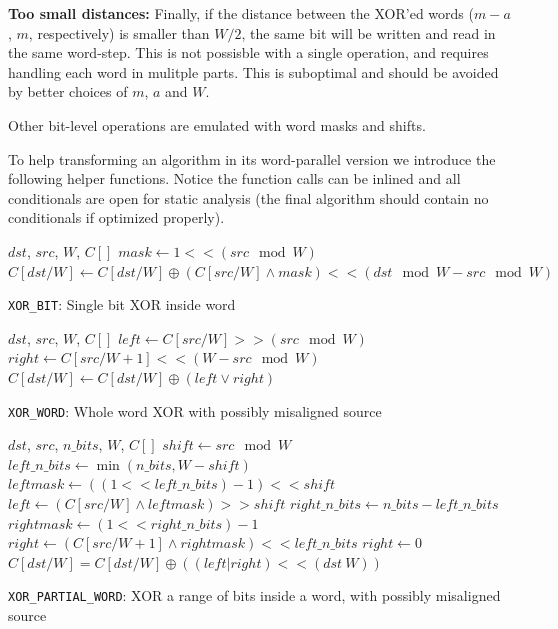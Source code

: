 \textbf{Too small distances:}
Finally, if the distance between the XOR'ed words ($m-a$, $m$, respectively) is smaller than $W/2$, the same bit will be written and read in the same word-step. This is not possisble with a single operation, and requires handling each word in mulitple parts. This is suboptimal and should be avoided by better choices of $m$, $a$ and $W$.

Other bit-level operations are emulated with word masks and shifts.

To help transforming an algorithm in its word-parallel version we introduce the following helper functions. Notice the function calls can be inlined and all conditionals are open for static analysis (the final algorithm should contain no conditionals if optimized properly).

\begin{algorithm}
\begin{algorithmic}[1]
  \REQUIRE $dst$, $src$, $W$, $C[]$
  \STATE $mask \gets 1 << (src \mod W)$
  \STATE $C[dst / W] \gets C[dst / W] \oplus (C[src / W] \land mask) << (dst \mod W - src \mod W)$
  \caption{\texttt{XOR\_BIT}: Single bit XOR inside word}
\end{algorithmic}
\end{algorithm}

\begin{algorithm}
\begin{algorithmic}[1]
  \REQUIRE $dst$, $src$, $W$, $C[]$
  \STATE $left \gets C[src / W] >> (src \mod W)$
  \STATE $right \gets C[src / W + 1] << (W - src \mod W)$
  \STATE $C[dst / W] \gets C[dst / W] \oplus (left \lor right)$
  \caption{\texttt{XOR\_WORD}: Whole word XOR with possibly misaligned source}
\end{algorithmic}
\end{algorithm}

\begin{algorithm}
\begin{algorithmic}[1]
  \REQUIRE $dst$, $src$, $n\_bits$, $W$, $C[]$
  \STATE $shift \gets src \mod W$
  \STATE $left\_n\_bits \gets \min(n\_bits, W - shift)$
  \STATE $leftmask \gets ((1 << left\_n\_bits) - 1) << shift$
  \STATE $left \gets (C[src / W] \land leftmask) >> shift$
  \STATE $right\_n\_bits \gets n\_bits - left\_n\_bits$
    \STATE $rightmask \gets (1 << right\_n\_bits) - 1$
    \STATE $right \gets (C[src/W+1] \land rightmask) << left\_n\_bits$
  \ELSE
    \STATE $right \gets 0$
  \ENDIF
  \STATE $C[dst/W] = C[dst/W] \oplus ((left | right) << (dst \ W))$
  \caption{\texttt{XOR\_PARTIAL\_WORD}: XOR a range of bits inside a word, with possibly misaligned source}
\end{algorithmic}
\end{algorithm}

